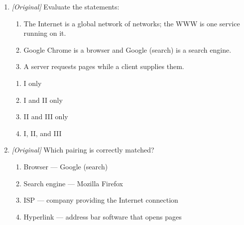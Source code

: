 \begin{enumerate}[label=\textbf{Q\arabic*.}, leftmargin=*]
\begin{enumerate}[label=\Alph*.]
      displays it
    \item ISP requests the page, hyperlink supplies it, browser stores it
    \item search engine provides the connection, server clicks the link
  \end{enumerate}
\item \textit{[Original]} Evaluate the statements:
  \begin{enumerate}[label=\Roman*.]
    \item The Internet is a global network of networks; the WWW is one
      service running on it.
    \item Google Chrome is a browser and Google (search) is a search engine.
    \item A server requests pages while a client supplies them.
  \end{enumerate}
  \begin{enumerate}[label=\Alph*.]
    \item I only
    \item I and II only
    \item II and III only
    \item I, II, and III
  \end{enumerate}
\item \textit{[Original]} Which pairing is correctly matched?
  \begin{enumerate}[label=\Alph*.]
    \item Browser --- Google (search)
    \item Search engine --- Mozilla Firefox
    \item ISP --- company providing the Internet connection
    \item Hyperlink --- address bar software that opens pages
  \end{enumerate}


\end{enumerate}
